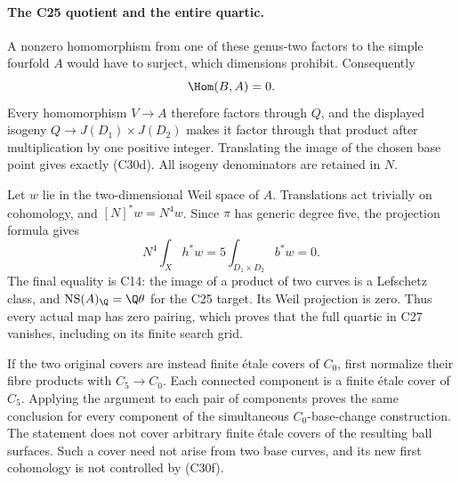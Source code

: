 \paragraph{The C25 quotient and the entire quartic.}
A nonzero homomorphism from one of these genus-two
factors to the simple fourfold $A$ would have to
surject, which dimensions prohibit.  Consequently
\[
                         \Hom(B,A)=0.
\]
Every homomorphism $V\to A$ therefore factors through
$Q$, and the displayed isogeny $Q\to J(D_1)\times
J(D_2)$ makes it factor through that product after
multiplication by one positive integer.  Translating
the image of the chosen base point gives exactly
(C30d).  All isogeny denominators are retained in $N$.

Let $w$ lie in the two-dimensional Weil space of $A$.
Translations act trivially on cohomology, and
$[N]^*w=N^4w$.  Since $\pi$ has generic degree five,
the projection formula gives
\[
 N^4\int_X h^*w
       =5\int_{D_1\times D_2}b^*w=0.
                                                        \tag{C30m}
\]
The final equality is C14: the image of a product
of two curves is a Lefschetz class, and
$\operatorname{NS}(A)_\Q=\Q\theta$ for the C25
target.  Its Weil projection is zero.  Thus every
actual map has zero pairing, which proves that the
full quartic in C27 vanishes, including on its finite
search grid.

If the two original covers are instead finite
\'etale covers of $C_0$, first normalize their fibre
products with $C_5\to C_0$.  Each connected component
is a finite \'etale cover of $C_5$.  Applying the
argument to each pair of components proves the same
conclusion for every component of the simultaneous
$C_0$-base-change construction.  The statement does
not cover arbitrary finite \'etale covers of the
resulting ball surfaces.  Such a cover need not
arise from two base curves, and its new first
cohomology is not controlled by (C30f).

